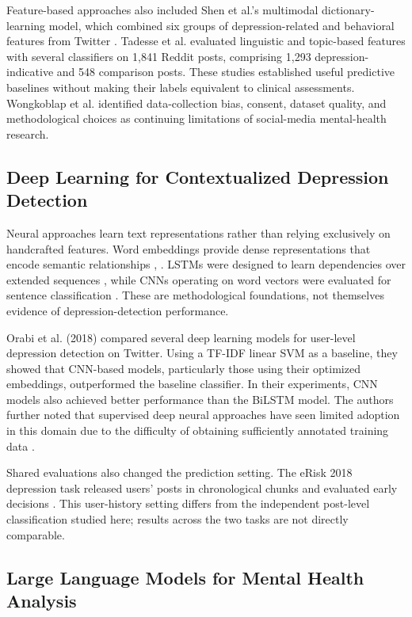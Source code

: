 \documentclass{ieeeaccess}
\begin{document}
Feature-based approaches also included Shen et al.'s multimodal dictionary-learning model, which combined six groups of depression-related and behavioral features from Twitter \cite{ref29}. Tadesse et al. \cite{ref31} evaluated linguistic and topic-based features with several classifiers on 1,841 Reddit posts, comprising 1,293 depression-indicative and 548 comparison posts. These studies established useful predictive baselines without making their labels equivalent to clinical assessments. Wongkoblap et al. \cite{ref24} identified data-collection bias, consent, dataset quality, and methodological choices as continuing limitations of social-media mental-health research.

\subsection{Deep Learning for Contextualized Depression Detection}

Neural approaches learn text representations rather than relying exclusively on handcrafted features. Word embeddings provide dense representations that encode semantic relationships \cite{ref25}, \cite{ref26}. LSTMs were designed to learn dependencies over extended sequences \cite{ref27}, while CNNs operating on word vectors were evaluated for sentence classification \cite{ref28}. These are methodological foundations, not themselves evidence of depression-detection performance.

Orabi et al. (2018) \cite{ref30} compared several deep learning models for user-level depression detection on Twitter. Using a TF-IDF linear SVM as a baseline, they showed that CNN-based models, particularly those using their optimized embeddings, outperformed the baseline classifier. In their experiments, CNN models also achieved better performance than the BiLSTM model. The authors further noted that supervised deep neural approaches have seen limited adoption in this domain due to the difficulty of obtaining sufficiently annotated training data \cite{ref30}.

Shared evaluations also changed the prediction setting. The eRisk 2018 depression task released users' posts in chronological chunks and evaluated early decisions \cite{ref32}. This user-history setting differs from the independent post-level classification studied here; results across the two tasks are not directly comparable.

\subsection{Large Language Models for Mental Health Analysis}
\end{document}
